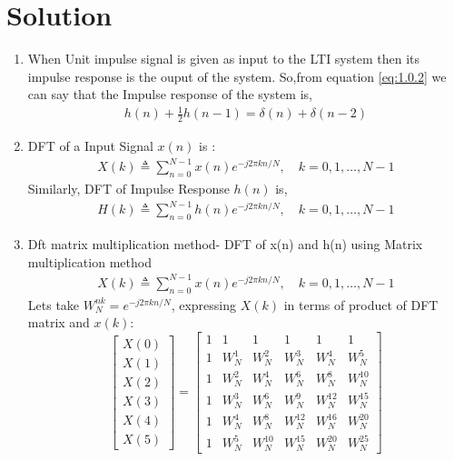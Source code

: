 \documentclass[journal,12pt,twocolumn]{IEEEtran}
\renewcommand\thesection{\arabic{section}}
\begin{document}
\section{Solution}
\begin{enumerate}[label=\thesection.\arabic*.,ref=\thesection.\theenumi]
\item
When Unit impulse signal is given as input to the LTI system then its impulse response is the ouput of the system.
So,from equation \eqref{eq:1.0.2} we can say that the Impulse response of the system is,
\begin{align}
    h(n) + \frac{1}{2}h(n-1) = \delta(n) + \delta(n-2)	
\end{align}
\item DFT of a Input Signal $x(n)$ is :
\begin{align}
    X(k) \triangleq \sum_{n=0}^{N-1}x(n)e^{-j2\pi kn/N},\quad k=0,1, \ldots, N-1 \label{eq:2.0.2}
\end{align}
Similarly, DFT of Impulse Response $h(n)$ is,
\begin{align}
    H(k) \triangleq \sum_{n=0}^{N-1}h(n)e^{-j2\pi kn/N},\quad k=0,1, \ldots, N-1 \label{eq:2.0.3}
\end{align}
\item
Dft matrix multiplication method- DFT of x(n) and h(n) using Matrix multiplication method
\\
\begin{align}
    X(k) \triangleq \sum_{n=0}^{N-1}x(n)e^{-j2\pi kn/N},\quad k=0,1, \ldots, N-1
\end{align}
Lets take $W_N^{nk}=e^{-j2\pi kn/N} $,
expressing $X(k)$ in terms of product of DFT matrix and $x(k)$:
\begin{equation}
 \begin{bmatrix} X(0) \\ X(1) \\ X(2) \\ X(3) \\ X(4) \\ X(5) \end{bmatrix}
=
\begin{bmatrix}
1 & 1 & 1 & 1 & 1 & 1 \\ 1 & W_N^1& W_N^2& W_N^3 & W_N^4 & W_N^5\\1 & W_N^2 & W_N^4 & W_N^6 & W_N^8 & W_N^{10}\\1 & W_N^3 & W_N^6 & W_N^9 & W_N^{12} & W_N^{15}\\1 & W_N^4 & W_N^8 & W_N^{12} & W_N^{16} & W_N^{20}\\1 & W_N^5 & W_N^{10} & W_N^{15} & W_N^{20} &W_N^{25}

\end{bmatrix}
\end{equation}
\end{enumerate}
\end{document}

